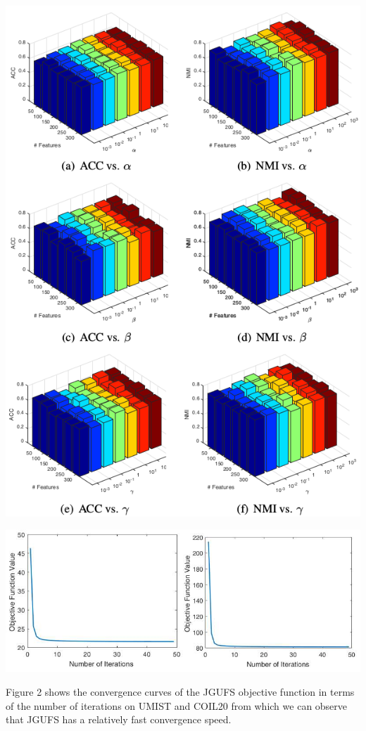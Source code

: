 \documentclass[a0paper,portrait]{baposter}
\begin{document}
\begin{poster}
{\begin{center}
\includegraphics[width=0.8\linewidth]{result_bar.jpg}
\vspace{-8pt}
\end{center}

\vspace{-15pt}
\begin{center}
\includegraphics[width=0.8\linewidth]{result_cur.jpg}
\vspace{-8pt}
\end{center}

\vspace{-8pt}
 Figure 2 shows the convergence curves of the JGUFS objective function in terms of the number of iterations on UMIST and COIL20 from which we can observe that JGUFS has a relatively fast convergence speed. 


}

\end{poster}
\end{document}
